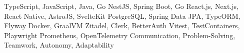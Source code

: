 \begin{cvskills}

   {TypeScript, JavaScript, Java, Go}
   {NestJS, Spring Boot, Go}
   {React.js, Next.js, React Native, AstroJS, SvelteKit}
   {PostgreSQL, Spring Data JPA, TypeORM, Flyway}
   {Docker, GraalVM}
   {Zitadel, Clerk, BetterAuth}
   {Vitest, TestContainers, Playwright}
   {Prometheus, OpenTelemetry}
   {Communication, Problem-Solving, Teamwork, Autonomy, Adaptability}

\end{cvskills}